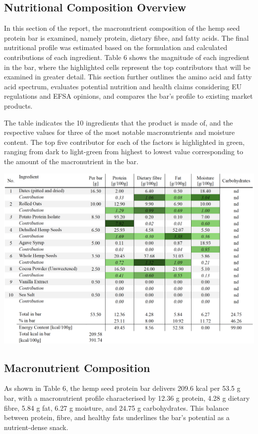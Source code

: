 \subsection{Nutritional Composition Overview}
In this section of the report, the macronutrient composition of the hemp seed protein bar is examined, namely protein, dietary fibre, and fatty acids. The final nutritional profile was estimated based on the formulation and calculated contributions of each ingredient. Table 6 shows the magnitude of each ingredient in the bar, where the highlighted cells represent the top contributors that will be examined in greater detail. This section further outlines the amino acid and fatty acid spectrum, evaluates potential nutrition and health claims considering EU regulations and EFSA opinions, and compares the bar’s profile to existing market products.



    \begin{table}[t]
        \caption{The table indicates the 10 ingredients that the product is made of, and the respective values for three of the most notable macronutrients and moisture content. The top five contributor for each of the factors is highlighted in green, ranging from dark to light-green from highest to lowest value corresponding to the amount of the macronutrient in the bar. }
    \label{tab:df_amino_acids_01}
    \includegraphics[width=\linewidth]{Figures/tab_overall_ingredients_01.png}
\end{table}

\subsection{Macronutrient Composition}
As shown in Table 6, the hemp seed protein bar delivers 209.6 kcal per 53.5 g bar, with a macronutrient profile characterised by 12.36 g protein, 4.28 g dietary fibre, 5.84 g fat, 6.27 g moisture, and 24.75 g carbohydrates. This balance between protein, fibre, and healthy fats underlines the bar’s potential as a nutrient-dense snack.

